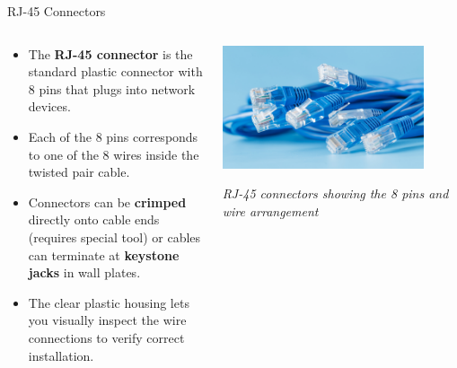 \documentclass[aspectratio=169]{beamer}
\begin{document}
\begin{frame}{RJ-45 Connectors}
    \begin{columns}[T]
        \begin{column}{0.55\textwidth}
            \begin{itemize}
                \item The \textbf{RJ-45 connector} is the standard plastic connector with 8 pins that plugs into network devices.
                \item Each of the 8 pins corresponds to one of the 8 wires inside the twisted pair cable.
                \item Connectors can be \textbf{crimped} directly onto cable ends (requires special tool) or cables can terminate at \textbf{keystone jacks} in wall plates.
                \item The clear plastic housing lets you visually inspect the wire connections to verify correct installation.
            \end{itemize}
        \end{column}
        \begin{column}{0.4\textwidth}
            \centering
            \includegraphics[width=0.85\textwidth]{RJ45s.jpg}
            \vspace{0.2cm}
            
            \small{\textit{RJ-45 connectors showing the 8 pins and wire arrangement}}
            

\end{column}
\end{columns}
\end{frame}
\end{document}
